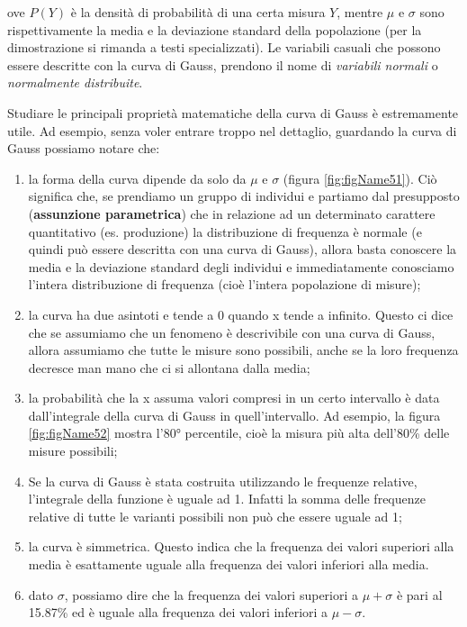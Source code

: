 \documentclass[a4paper,12pt,oneside]{book}
\providecommand{\tightlist}{%
  \setlength{\itemsep}{0pt}\setlength{\parskip}{0pt}}
\begin{document}
ove \(P(Y)\) è la densità di probabilità di una certa misura \(Y\), mentre \(\mu\) e \(\sigma\) sono rispettivamente la media e la deviazione standard della popolazione (per la dimostrazione si rimanda a testi specializzati). Le variabili casuali che possono essere descritte con la curva di Gauss, prendono il nome di \emph{variabili normali} o \emph{normalmente distribuite}.

Studiare le principali proprietà matematiche della curva di Gauss è estremamente utile. Ad esempio, senza voler entrare troppo nel dettaglio, guardando la curva di Gauss possiamo notare che:

\begin{enumerate}
\def\labelenumi{\arabic{enumi}.}
\tightlist
\item
  la forma della curva dipende da solo da \(\mu\) e \(\sigma\) (figura \ref{fig:figName51}). Ciò significa che, se prendiamo un gruppo di individui e partiamo dal presupposto (\textbf{assunzione parametrica}) che in relazione ad un determinato carattere quantitativo (es. produzione) la distribuzione di frequenza è normale (e quindi può essere descritta con una curva di Gauss), allora basta conoscere la media e la deviazione standard degli individui e immediatamente conosciamo l'intera distribuzione di frequenza (cioè l'intera popolazione di misure);
\item
  la curva ha due asintoti e tende a 0 quando x tende a infinito. Questo ci dice che se assumiamo che un fenomeno è descrivibile con una curva di Gauss, allora assumiamo che tutte le misure sono possibili, anche se la loro frequenza decresce man mano che ci si allontana dalla media;
\item
  la probabilità che la x assuma valori compresi in un certo intervallo è data dall'integrale della curva di Gauss in quell'intervallo. Ad esempio, la figura \ref{fig:figName52} mostra l'80° percentile, cioè la misura più alta dell'80\% delle misure possibili;
\item
  Se la curva di Gauss è stata costruita utilizzando le frequenze relative, l'integrale della funzione è uguale ad 1. Infatti la somma delle frequenze relative di tutte le varianti possibili non può che essere uguale ad 1;
\item
  la curva è simmetrica. Questo indica che la frequenza dei valori superiori alla media è esattamente uguale alla frequenza dei valori inferiori alla media.
\item
  dato \(\sigma\), possiamo dire che la frequenza dei valori superiori a \(\mu + \sigma\) è pari al 15.87\% ed è uguale alla frequenza dei valori inferiori a \(\mu - \sigma\).
\end{enumerate}
\end{document}
